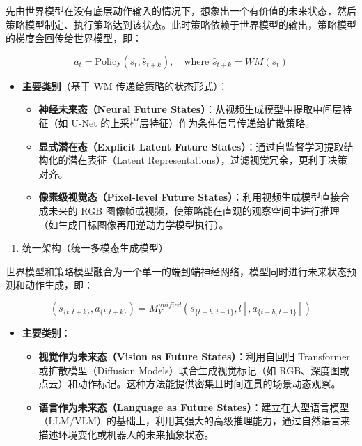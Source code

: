 先由世界模型在没有底层动作输入的情况下，想象出一个有价值的未来状态，然后策略模型制定、执行策略达到该状态。此时策略依赖于世界模型的输出，策略模型的梯度会回传给世界模型，即：

\[
a_t = \mathrm{Policy}(s_t, \hat{s}_{t+k}), \quad \text{where } \hat{s}_{t+k} = WM(s_t)
\]

\begin{itemize}
\tightlist
\item
  \textbf{主要类别}（基于 WM 传递给策略的状态形式）：

  \begin{itemize}
  \tightlist
  \item
    \textbf{神经未来态（Neural Future States）}：从视频生成模型中提取中间层特征（如 U-Net 的上采样层特征）作为条件信号传递给扩散策略。
  \item
    \textbf{显式潜在态（Explicit Latent Future States）}：通过自监督学习提取结构化的潜在表征（Latent Representations），过滤视觉冗余，更利于决策对齐。
  \item
    \textbf{像素级视觉态（Pixel-level Future States）}：利用视频生成模型直接合成未来的 RGB 图像帧或视频，使策略能在直观的观察空间中进行推理（如生成目标图像再用逆动力学模型执行）。
  \end{itemize}
\end{itemize}

\begin{enumerate}
\def\labelenumi{\arabic{enumi}.}
\setcounter{enumi}{2}
\tightlist
\item
  统一架构（统一多模态生成模型）
\end{enumerate}

世界模型和策略模型融合为一个单一的端到端神经网络，模型同时进行未来状态预测和动作生成，即：

\[
\left(s_{\{t,t+k\}}, a_{\{t,t+k\}}\right) = M_Y^{unified}\left(s_{\{t-h,t-1\}}, l[, a_{\{t-h,t-1\}}]\right)
\]

\begin{itemize}
\tightlist
\item
  \textbf{主要类别}：

  \begin{itemize}
  \tightlist
  \item
    \textbf{视觉作为未来态（Vision as Future States）}：利用自回归 Transformer 或扩散模型（Diffusion Models）联合生成视觉标记（如 RGB、深度图或点云）和动作标记。这种方法能提供密集且时间连贯的场景动态观察。
  \item
    \textbf{语言作为未来态（Language as Future States）}：建立在大型语言模型（LLM/VLM）的基础上，利用其强大的高级推理能力，通过自然语言来描述环境变化或机器人的未来抽象状态。
  \end{itemize}
\end{itemize}

